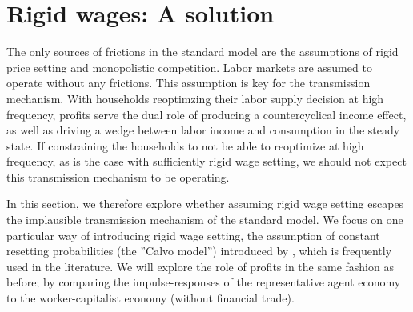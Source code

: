 \section{Rigid wages: A solution}
\label{sec:wage_rigidity}


The only sources of frictions in the standard model are the assumptions of rigid price setting and monopolistic competition. Labor markets are assumed to operate without any frictions. This assumption is key for the transmission mechanism. With households reoptimzing their labor supply decision at high frequency, profits serve the dual role of producing a countercyclical income effect, as well as driving a wedge between labor income and consumption in the steady state. If constraining the households to not be able to reoptimize at high frequency, as is the case with sufficiently rigid wage setting, we should not expect this transmission mechanism to be operating.

In this section, we therefore explore whether assuming rigid wage setting escapes the implausible transmission mechanism of the standard model. We focus on one particular way of introducing rigid wage setting, the assumption of constant resetting probabilities (the ''Calvo model'') introduced by \citet{Erceg2000}, which is frequently used in the literature. We will explore the role of profits in the same fashion as before; by comparing the impulse-responses of the representative agent economy to the worker-capitalist economy (without financial trade).

